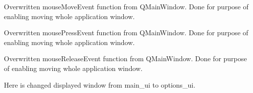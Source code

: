 \documentclass[letterpaper,10pt,english]{sphinxmanual}
\begin{document}
\begin{fulllineitems}
\begin{fulllineitems}
\label{\detokenize{main:main.MainWindow.mouseMoveEvent}}
\pysigstartsignatures
{}
\pysigstopsignatures
\sphinxAtStartPar
Overwritten mouseMoveEvent function from QMainWindow. Done for purpose of enabling moving whole application
window.

\end{fulllineitems}


\begin{fulllineitems}
\label{\detokenize{main:main.MainWindow.mousePressEvent}}
\pysigstartsignatures
{}
\pysigstopsignatures
\sphinxAtStartPar
Overwritten mousePressEvent function from QMainWindow. Done for purpose of enabling moving whole application
window.

\end{fulllineitems}


\begin{fulllineitems}
\label{\detokenize{main:main.MainWindow.mouseReleaseEvent}}
\pysigstartsignatures
{}
\pysigstopsignatures
\sphinxAtStartPar
Overwritten mouseReleaseEvent function from QMainWindow. Done for purpose of enabling moving whole application
window.

\end{fulllineitems}


\begin{fulllineitems}
\label{\detokenize{main:main.MainWindow.options_dialog}}
\pysigstartsignatures
{}
\pysigstopsignatures
\sphinxAtStartPar
Here is changed displayed window from main\_ui to options\_ui.

\end{fulllineitems}


\end{fulllineitems}
\end{document}
